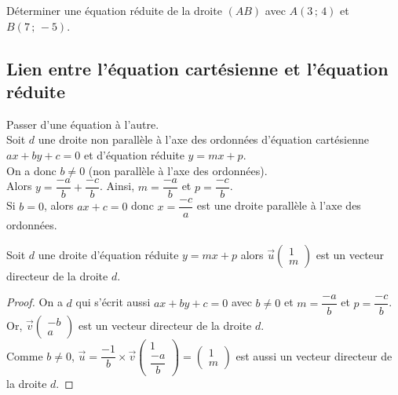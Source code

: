 \begin{Exemple}
Déterminer une équation réduite de la droite $(AB)$ avec $A(3\,;\,4)$ et $B(7\,;\,-5)$. 
\vspace{0.1cm}

\ligne

\ligne

\ligne

\ligne

\ligne

\ligne

\ligne

\ligne

\end{Exemple}

\subsection{Lien entre l'équation cartésienne et l'équation réduite}
\begin{Méthode}Passer d'une équation à l'autre. \\
Soit $d$ une droite non parallèle à l'axe des ordonnées d'équation cartésienne $ax+by+c=0$ et d'équation réduite $y=mx+p$. \\
On a donc $b\neq 0$ (non parallèle à l'axe des ordonnées).\\
Alors $y=\dfrac{-a}{b}+\dfrac{-c}{b}$. Ainsi, $m=\dfrac{-a}{b}$ et $p=\dfrac{-c}{b}$.\\
Si $b=0$, alors $ax+c=0$ donc $x=\dfrac{-c}{a}$ est une droite parallèle à l'axe des ordonnées.
\end{Méthode}

\begin{Propriété}
Soit $d$ une droite d'équation réduite $y=mx+p$ alors $\overrightarrow{u}\begin{pmatrix}
1 \\
m\end{pmatrix}$ est un vecteur directeur de la droite $d$.
\end{Propriété}

\begin{proof}
On a $d$ qui s'écrit aussi $ax+by+c=0$ avec $b\neq 0$ et $m=\dfrac{-a}{b}$ et $p=\dfrac{-c}{b}$.\\
Or, $\overrightarrow{v}\begin{pmatrix}
-b \\
a \end{pmatrix}$ est un vecteur directeur de la droite $d$. \\
Comme $b\neq 0$, $\overrightarrow{u}=\dfrac{-1}{b}\times\overrightarrow{v}\begin{pmatrix}
1 \\
\dfrac{-a}{b}\end{pmatrix}=\begin{pmatrix}
1 \\
m\end{pmatrix}$ est aussi un vecteur directeur de la droite $d$. 
\end{proof}
\newpage

